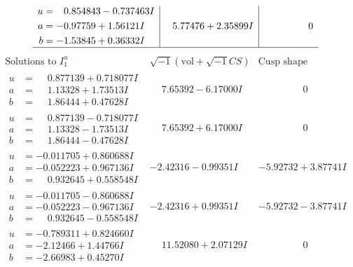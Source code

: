 \documentclass[1p]{elsarticle_modified}
\theoremstyle{definition}
\newcommand{\I}{\sqrt{-1}}
\begin{document}
$$\begin{array}{c|c|c}
\begin{aligned}
u &= \phantom{-}0.854843 - 0.737463 I \\
a &= -0.97759 + 1.56121 I \\
b &= -1.53845 + 0.36332 I\end{aligned}
 & \phantom{-}5.77476 + 2.35899 I & \phantom{-0.000000 } 0\\
 \hline 
 \end{array}$$\newpage$$\begin{array}{c|c|c}  
\text{Solutions to }I^u_{1}& \I (\text{vol} + \sqrt{-1}CS) & \text{Cusp shape}\\
 \hline 
\begin{aligned}
u &= \phantom{-}0.877139 + 0.718077 I \\
a &= \phantom{-}1.13328 + 1.73513 I \\
b &= \phantom{-}1.86444 + 0.47628 I\end{aligned}
 & \phantom{-}7.65392 - 6.17000 I & \phantom{-0.000000 } 0 \\ \hline\begin{aligned}
u &= \phantom{-}0.877139 - 0.718077 I \\
a &= \phantom{-}1.13328 - 1.73513 I \\
b &= \phantom{-}1.86444 - 0.47628 I\end{aligned}
 & \phantom{-}7.65392 + 6.17000 I & \phantom{-0.000000 } 0 \\ \hline\begin{aligned}
u &= -0.011705 + 0.860688 I \\
a &= -0.052223 + 0.967136 I \\
b &= \phantom{-}0.932645 + 0.558548 I\end{aligned}
 & -2.42316 - 0.99351 I & -5.92732 + 3.87741 I \\ \hline\begin{aligned}
u &= -0.011705 - 0.860688 I \\
a &= -0.052223 - 0.967136 I \\
b &= \phantom{-}0.932645 - 0.558548 I\end{aligned}
 & -2.42316 + 0.99351 I & -5.92732 - 3.87741 I \\ \hline\begin{aligned}
u &= -0.789311 + 0.824660 I \\
a &= -2.12466 + 1.44766 I \\
b &= -2.66983 + 0.45270 I\end{aligned}
 & \phantom{-}11.52080 + 2.07129 I & \phantom{-0.000000 } 0 \\ \hline\begin{aligned}

\end{aligned}
\end{array}$$
\end{document}

